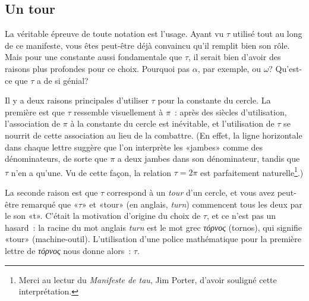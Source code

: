   \subsection{Un tour} %
  \label{sec:one_turn}

La véritable épreuve de toute notation est l'usage. Ayant vu $\tau$
utilisé tout au long de ce manifeste, vous êtes peut-être déjà convaincu qu'il
remplit bien son rôle. Mais pour une constante aussi fondamentale que $\tau$, il
serait bien d'avoir des raisons plus profondes pour ce choix. Pourquoi pas
$\alpha$, par exemple, ou $\omega$\ns? Qu'est-ce que $\tau$ a de si génial\ns?

Il y a deux raisons principales d'utiliser $\tau$ pour la constante du cercle.
La première est que $\tau$ ressemble visuellement à $\pi$~: après des siècles
d'utilisation, l'association de $\pi$ à la constante du cercle est inévitable,
et l'utilisation de $\tau$ se nourrit de cette association au lieu de la
combattre. (En effet, la ligne horizontale dans chaque lettre suggère que l'on
interprète les «\ns jambes\ns » comme des dénominateurs, de sorte que $\pi$ a deux
jambes dans son dénominateur, tandis que $\tau$ n'en a qu'une. Vu de cette
façon, la relation $\tau = 2\pi$ est parfaitement naturelle\ns\footnote{Merci au
lectur du \emph{Manifeste de tau}, Jim Porter, d'avoir souligné cette
interprétation.}.)

La seconde raison est que $\tau$ correspond à un \emph{tour} d'un cercle, et
vous avez peut-être remarqué que «\ns $\tau$\ns » et «\ns tour\ns » (en anglais,
\emph{turn}) commencent tous les deux par le son «\ns t\ns ». C'était la
motivation d'origine du choix de $\tau$, et ce n'est pas un hasard~: la racine
du mot anglais \emph{turn} est le mot grec \emph{τόρνος} (tornos), qui signifie
«\ns tour\ns » (machine-outil). L'utilisation d'une
police mathématique pour la première lettre de \emph{τόρνος} nous donne alors~: $\tau$.

